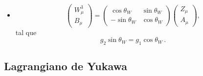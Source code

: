 \begin{frame}
\begin{itemize}
\item 
\begin{equation}
\label{eq:azmix}
  \begin{pmatrix}
    W^3_\mu\\
    B_\mu
  \end{pmatrix}=\begin{pmatrix}
    \cos\theta_W & \sin\theta_W\\
    -\sin\theta_W& \cos\theta_W
  \end{pmatrix}
  \begin{pmatrix}
    Z_\mu\\
    A_\mu
  \end{pmatrix},
\end{equation}
tal que
\begin{equation}
  \label{eq:tw}
  g_2\sin\theta_W={g_1}\cos\theta_W\,.
\end{equation}
\end{itemize} %

\end{frame}
\subsection{Lagrangiano  de Yukawa }

